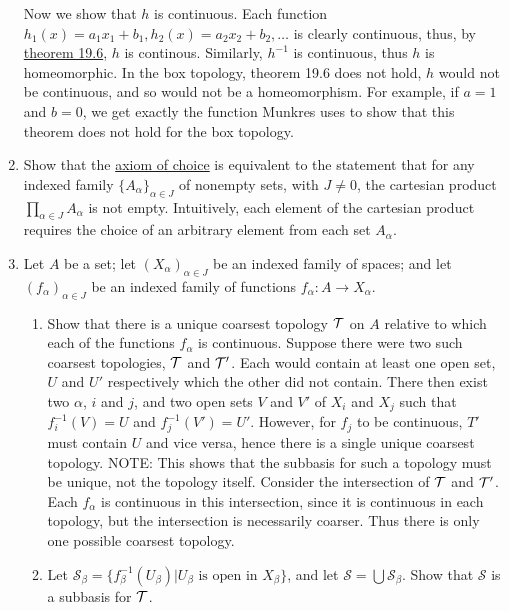 \documentclass[12pt,letterpaper]{article}
\begin{document}
\begin{enumerate}
  \indent Now we show that $h$ is continuous. Each function $h_1(x) = a_1x_1+b_1, h_2(x)=a_2x_2+b_2, \dots$ is clearly continuous, thus, by \hyperref[thm:MapsProducts19.6]{theorem 19.6}, $h$ is continous. Similarly, $h^{-1}$ is continuous, thus $h$ is homeomorphic.\hspace{5in}\n
  \indent In the box topology, theorem 19.6 does not hold, $h$ would not be continuous, and so would not be a homeomorphism. For example, if $a=1$ and $b=0$, we get exactly the function Munkres uses to show that this theorem does not hold for the box topology.
  \item Show that the \hyperref[thm:AxiomChoice]{axiom of choice} is equivalent to the statement that for any indexed family $\{A_\alpha\}_{\alpha\in J}$ of nonempty sets, with $J\neq 0$, the cartesian product $\prod_{\alpha\in J} A_\alpha$ is not empty.\n
  \indent Intuitively, each element of the cartesian product requires the choice of an arbitrary element from each set $A_\alpha$.
  \item Let $A$ be a set; let $(X_\alpha)_{\alpha\in J}$ be an indexed family of spaces; and let $(f_\alpha)_{\alpha\in J}$ be an indexed family of functions $f_\alpha: A \rightarrow X_\alpha$.
  \begin{enumerate}
    \item Show that there is a unique coarsest topology $\mathcal{T}$ on $A$ relative to which each of the functions $f_\alpha$ is continuous.\hspace{5in}\n
    \indent Suppose there were two such coarsest topologies, $\mathcal{T}$ and $\mathcal{T}'$. Each would contain at least one open set, $U$ and $U'$ respectively which the other did not contain. There then exist two $\alpha$, $i$ and $j$, and two open sets $V$ and $V'$ of $X_i$ and $X_j$ such that $f_i^{-1}(V)=U$ and $f_j^{-1}(V')=U'$. However, for $f_j$ to be continuous, $T'$ must contain $U$ and vice versa, hence there is a single unique coarsest topology. NOTE: This shows that the subbasis for such a topology must be unique, not the topology itself. \n
    \indent Consider the intersection of $\mathcal{T}$ and $\mathcal{T}'$. Each $f_\alpha$ is continuous in this intersection, since it is continuous in each topology, but the intersection is necessarily coarser. Thus there is only one possible coarsest topology. 
    \item Let $\mathcal{S}_\beta=\{f_\beta^{-1}(U_\beta) | U_\beta \text{ is open in } X_\beta\}$, and let $\mathcal{S}=\bigcup \mathcal{S}_\beta$. Show that $\mathcal{S}$ is a subbasis for $\mathcal{T}$.\hspace{5in}\n

\end{enumerate}
\end{enumerate}
\end{document}
